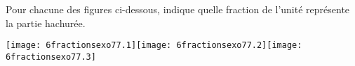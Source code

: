 Pour chacune des figures ci-dessous, indique quelle fraction de
l'unité représente la partie hachurée.
\par
\texttt{[image: 6fractionsexo77.1]}\hfill\texttt{[image: 6fractionsexo77.2]}\hfill\texttt{[image: 6fractionsexo77.3]}
